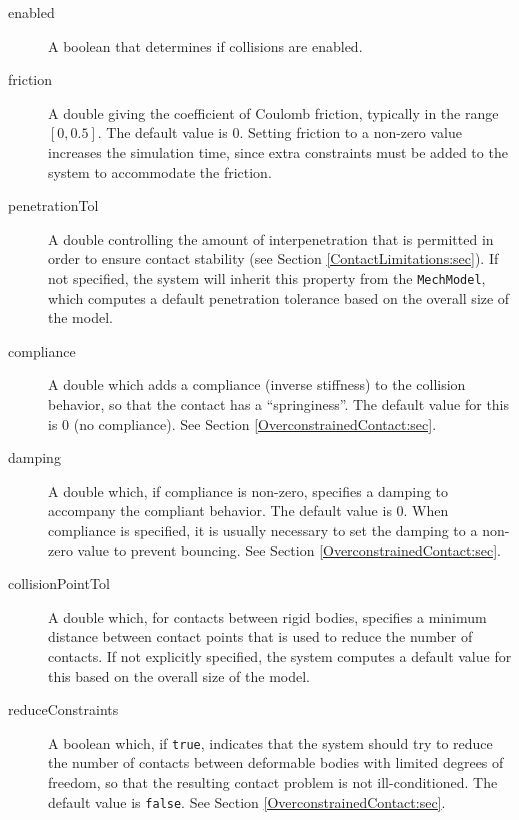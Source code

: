 \begin{description}

\item[enabled]\mbox{}

A boolean that determines if collisions are enabled.

\item[friction]\mbox{}

A double giving the coefficient of Coulomb friction, typically in the
range $[0,0.5]$. The default value is 0. Setting friction to a
non-zero value increases the simulation time, since extra constraints
must be added to the system to accommodate the friction. 

\item[penetrationTol]\mbox{}

A double controlling the amount of interpenetration that is permitted
in order to ensure contact stability (see Section
\ref{ContactLimitations:sec}). If not specified, the system will
inherit this property from the {\tt MechModel}, which computes a
default penetration tolerance based on the overall size of the model.

\item[compliance]\mbox{}

A double which adds a compliance (inverse stiffness) to the collision
behavior, so that the contact has a ``springiness''. The default value
for this is 0 (no compliance). See Section
\ref{OverconstrainedContact:sec}.

\item[damping]\mbox{}

A double which, if {\sf compliance} is non-zero, specifies a damping
to accompany the compliant behavior. The default value is 0.  When
compliance is specified, it is usually necessary to set the damping to
a non-zero value to prevent bouncing. See Section
\ref{OverconstrainedContact:sec}.

\item[collisionPointTol]\mbox{}

A double which, for contacts between rigid bodies, specifies a minimum
distance between contact points that is used to reduce the number of
contacts. If not explicitly specified, the system computes a
default value for this based on the overall size of the model.

\item[reduceConstraints]\mbox{}

A boolean which, if {\tt true}, indicates that the system should try
to reduce the number of contacts between deformable bodies with
limited degrees of freedom, so that the resulting contact problem is
not ill-conditioned.  The default value is {\tt false}. See Section
\ref{OverconstrainedContact:sec}.


\end{description}
